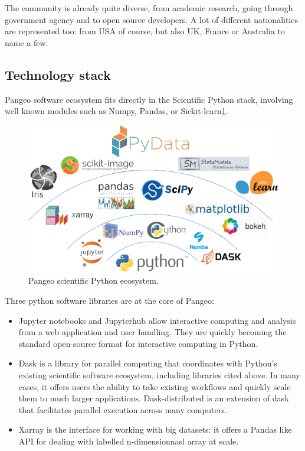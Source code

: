 \documentclass{article}
\begin{document}
The community is already quite diverse, from academic research, going through government agency and to open source developers. A lot of different nationalities are represented too: from USA of course, but also UK, France or Australia to name a few.


\subsection{Technology stack}
\label{ssec:techstack}

Pangeo software ecosystem fits directly in the Scientific Python stack, involving well known modules such as Numpy, Pandas, or Sickit-learn\ref{scipy_stack}.

\begin{figure}
  \centering
  \includegraphics[width=\columnwidth]{pangeo_python_stack.png}
  \caption{\label{scipy_stack} Pangeo scientific Python ecosystem.}
\end{figure}

Three python software libraries are at the core of Pangeo:
\begin{itemize}
\item Jupyter notebooks and Jupyterhub allow interactive computing and analysis from a web application and user handling. They are quickly becoming the standard open-source format for interactive computing in Python.
\item Dask is a library for parallel computing that coordinates with Python’s existing scientific software ecosystem, including libraries cited above. In many cases, it offers users the ability to take existing workflows and quickly scale them to much larger applications. Dask-distributed is an extension of dask that facilitates parallel execution across many computers.
\item Xarray is the interface for working with big datasets: it offers a Pandas like API for dealing with labelled n-dimensionnasl array at scale.
\end{itemize}
\end{document}

